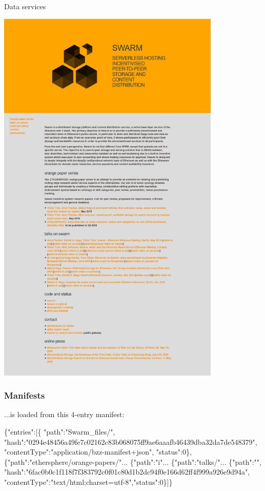 \documentclass{beamer}
\begin{document}
\begin{section}{Data services}
\begin{frame}
 \includegraphics[width=0.8\textwidth]{devcon-swarmsite.pdf}
\end{frame}

\begin{frame}[fragile]
\frametitle{Manifests}
 ...is loaded from this 4-entry manifest:\\
\tiny
\begin{semiverbatim}
\{"entries":[\{
"path":"Swarm_files/",
"hash":"0294e48456a49fe7c02162c83b068075ff9ae6aaafb46439dba32da7de548379",
"contentType":"application/bzz-manifest+json",
"status":0\},
\{"path":"ethersphere/orange-papers/"...
\{"path":"i"...
\{"path":"talks/"...
\{"path":"",
"hash":"6fac0b0c1f118f7f383792c0f01c80d1b2dc94f0e166d62ff4f999a926e9d94a",
"contentType":"text/html;charset=utf-8","status":0\}]\}\end{semiverbatim}
\end{frame}


\end{section}
\end{document}
